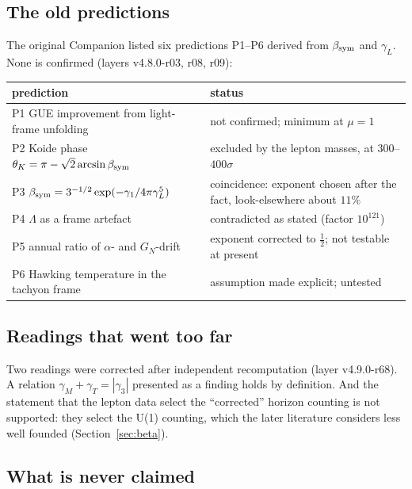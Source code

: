 \subsection{The old predictions}

The original Companion listed six predictions P1--P6 derived from \(\beta_{\rm sym}\) and \(\gamma_L\).  None is confirmed (layers v4.8.0-r03,
r08, r09):
\begin{center}
\small
\begin{tabular}{@{}>{\raggedright\arraybackslash}p{}>{\raggedright\arraybackslash}p{}@{}}
\toprule
prediction & status\\
\midrule
P1 GUE improvement from light-frame unfolding & not confirmed; minimum at \(\mu=1\)\\
P2 Koide phase \(\theta_K=\pi-\sqrt2\arcsin\beta_{\rm sym}\) & excluded by the lepton masses, at \(300\)--\(400\sigma\)\\
P3 \(\beta_{\rm sym}=3^{-1/2}\exp(-\gamma_1/4\pi\gamma_L^5)\) & coincidence: exponent chosen after the fact, look-elsewhere about \(11\%\)\\
P4 \(\Lambda\) as a frame artefact & contradicted as stated (factor \(10^{121}\))\\
P5 annual ratio of \(\alpha\)- and \(G_N\)-drift & exponent corrected to \(\tfrac12\); not testable at present\\
P6 Hawking temperature in the tachyon frame & assumption made explicit; untested\\
\bottomrule
\end{tabular}
\end{center}

\subsection{Readings that went too far}

Two readings were corrected after independent recomputation (layer v4.9.0-r68).  A relation \(\gamma_M+\gamma_T=|\gamma_3|\) presented as a finding
holds by definition.  And the statement that the lepton data select the ``corrected'' horizon counting is not supported: they select the
U(1) counting, which the later literature considers less well founded (Section~\ref{sec:beta}).

\subsection{What is never claimed}

